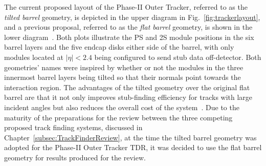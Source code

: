 The current proposed layout of the Phase-II Outer Tracker, referred to as the \emph{tilted barrel} geometry, is depicted in the upper diagram in Fig.~\ref{fig:trackerlayout}, and a previous proposal, referred to as the \emph{flat barrel} geometry, is shown in the lower diagram~\cite{CMS_Upgrade_TP}.
Both plots illustrate the PS and 2S module positions in the six barrel layers and the five endcap disks either side of the barrel, with only modules located at $|\eta| < 2.4$ being configured to send stub data off-detector.
Both geometries' names were inspired by whether or not the modules in the three innermost barrel layers being tilted so that their normals point towards the interaction region.
The advantages of the tilted geometry over the original flat barrel are that it not only improves stub-finding efficiency for tracks with large incident angles but also reduces the overall cost of the system~\cite{P2TrackerTDR}.
Due to the maturity of the preparations for the review between the three competing proposed track finding systems, discussed in Chapter~\ref{subsec:TrackFinderReview}, at the time the tilted barrel geometry was adopted for the Phase-II Outer Tracker TDR, it was decided to use the flat barrel geometry for results produced for the review.

